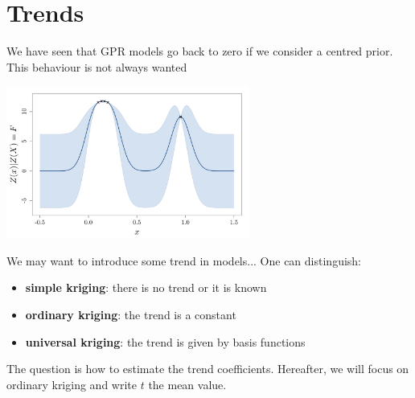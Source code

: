 \documentclass{beamer}
\begin{document}
\section{Trends}

\begin{frame}{}
We have seen that GPR models go back to zero if we consider a centred prior. \\ \vspace{5mm} This behaviour is not always wanted
\begin{center}
	\includegraphics[height=5cm]{figures/trend_pb2}
\end{center}
\end{frame}

\begin{frame}{}
We may want to introduce some trend in models... One can distinguish:
\begin{itemize}
	\item \textbf{simple kriging}: there is no trend or it is known
	\item \textbf{ordinary kriging}: the trend is a constant
	\item \textbf{universal kriging}: the trend is given by basis functions
\end{itemize}
\vspace{5mm} 
The question is how to estimate the trend coefficients. Hereafter, we will focus on ordinary kriging and write $t$ the mean value.
\end{frame}
\end{document}
